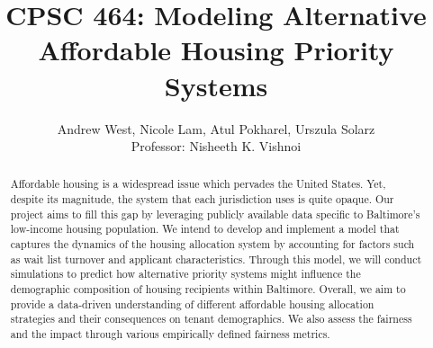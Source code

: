 \documentclass[11pt]{article}
\title{\bf CPSC 464: Modeling Alternative Affordable Housing Priority Systems}
\author{Andrew West, Nicole Lam, Atul Pokharel, Urszula Solarz \\
Professor: Nisheeth K. Vishnoi
}
\begin{document}
\maketitle
 
\begin{abstract}
Affordable housing is a widespread issue which pervades the United States. Yet, despite its magnitude, the system that each jurisdiction uses is quite opaque. Our project aims to fill this gap by leveraging publicly available data specific to Baltimore's low-income housing population. We intend to develop and implement a model that captures the dynamics of the housing allocation system by accounting for factors such as wait list turnover and applicant characteristics. Through this model, we will conduct simulations to predict how alternative priority systems might influence the demographic composition of housing recipients within Baltimore. Overall, we aim to provide a data-driven understanding of different affordable housing allocation strategies and their consequences on tenant demographics. We also assess the fairness and the impact through various empirically defined fairness metrics. 
\end{abstract}


\newpage



\tableofcontents

\newpage
\end{document}
